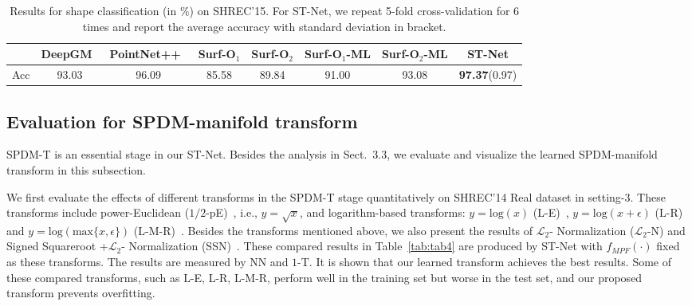 \documentclass[runningheads]{llncs}
\begin{document}
\begin{table}[t]
\caption{Results for shape classification (in $\%$) on SHREC'15. For ST-Net, we repeat 5-fold cross-validation for 6 times and report the average accuracy with standard deviation in bracket.}
\newcommand{\tabincell}[2]{\begin{tabular}{@{}#1@{}}#2\end{tabular}}
\begin{center}
\begin{tabular}{|l|| c| c|  c| c| c| c| c|}
\hline
  & DeepGM~\cite{Luciano2017Deep} & PointNet++~\cite{qi2017pointnetplusplus} & Surf-O$_1$ & Surf-O$_2$ & Surf-O$_1$-ML & Surf-O$_2$-ML & ST-Net\\
\hline
Acc & 93.03 & 96.09  & 85.58&89.84 & 91.00 & 93.08  & \textbf{97.37}(0.97)\\
\hline
\end{tabular}
\end{center}
\label{tab:tab6}
\end{table}
 
\subsection{Evaluation for SPDM-manifold transform}
SPDM-T is an essential stage in our ST-Net.  Besides the analysis in Sect.~3.3, we evaluate and visualize the learned SPDM-manifold transform in this subsection.

We first evaluate the effects of different transforms in the SPDM-T stage quantitatively on SHREC'14 Real dataset in setting-3.  These transforms include power-Euclidean ($1/2$-pE)~\cite{dryden2009non-euclidean}, i.e., $y = \sqrt{x}$,  and logarithm-based transforms: $y = \mbox{log}(x)$ (L-E)~\cite{dryden2009non-euclidean}, $y = \mbox{log}(x+\epsilon)$ (L-R)~\cite{Catalin2}   and $y = \mbox{log}(\mbox{max}\{x, \epsilon\})$ (L-M-R)~\cite{huang2016a}.  Besides the transforms mentioned above, we also present the results of $\mathcal{L}_2$- Normalization ($\mathcal{L}_2$-N) and Signed Squareroot +$\mathcal{L}_2$- Normalization (SSN)~\cite{Tsungyu}. These compared results in Table~\ref{tab:tab4} are produced by ST-Net with $f_{MPF}(\cdot)$ fixed as these transforms. The results are measured by NN and $1$-T. It is shown that our learned transform achieves the best results. Some of these compared transforms, such as L-E, L-R, L-M-R, perform well in the training set but worse in the test set, and our proposed transform  prevents overfitting. 
\end{document}
